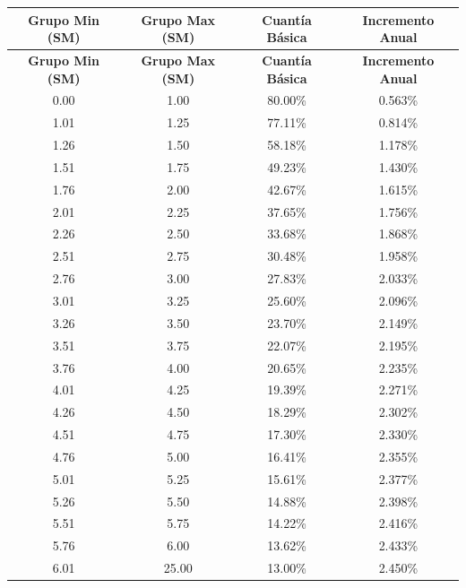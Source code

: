 \documentclass[11pt,a4paper]{report}
\begin{document}
\begin{tcolorbox}[colback=blue!5!white, colframe=blue!75!black, title=\textbf{Definici\'on Formal}]
\begin{center}
\begin{longtable}{cccc}
\toprule
\textbf{Grupo Min (SM)} & \textbf{Grupo Max (SM)} & \textbf{Cuant\'ia B\'asica} & \textbf{Incremento Anual} \\
\midrule
\endfirsthead
\toprule
\textbf{Grupo Min (SM)} & \textbf{Grupo Max (SM)} & \textbf{Cuant\'ia B\'asica} & \textbf{Incremento Anual} \\
\midrule
\endhead
0.00 & 1.00 & 80.00\% & 0.563\% \\
1.01 & 1.25 & 77.11\% & 0.814\% \\
1.26 & 1.50 & 58.18\% & 1.178\% \\
1.51 & 1.75 & 49.23\% & 1.430\% \\
1.76 & 2.00 & 42.67\% & 1.615\% \\
2.01 & 2.25 & 37.65\% & 1.756\% \\
2.26 & 2.50 & 33.68\% & 1.868\% \\
2.51 & 2.75 & 30.48\% & 1.958\% \\
2.76 & 3.00 & 27.83\% & 2.033\% \\
3.01 & 3.25 & 25.60\% & 2.096\% \\
3.26 & 3.50 & 23.70\% & 2.149\% \\
3.51 & 3.75 & 22.07\% & 2.195\% \\
3.76 & 4.00 & 20.65\% & 2.235\% \\
4.01 & 4.25 & 19.39\% & 2.271\% \\
4.26 & 4.50 & 18.29\% & 2.302\% \\
4.51 & 4.75 & 17.30\% & 2.330\% \\
4.76 & 5.00 & 16.41\% & 2.355\% \\
5.01 & 5.25 & 15.61\% & 2.377\% \\
5.26 & 5.50 & 14.88\% & 2.398\% \\
5.51 & 5.75 & 14.22\% & 2.416\% \\
5.76 & 6.00 & 13.62\% & 2.433\% \\
6.01 & 25.00 & 13.00\% & 2.450\% \\
\bottomrule
\end{longtable}
\end{center}
\end{tcolorbox}
\end{document}

